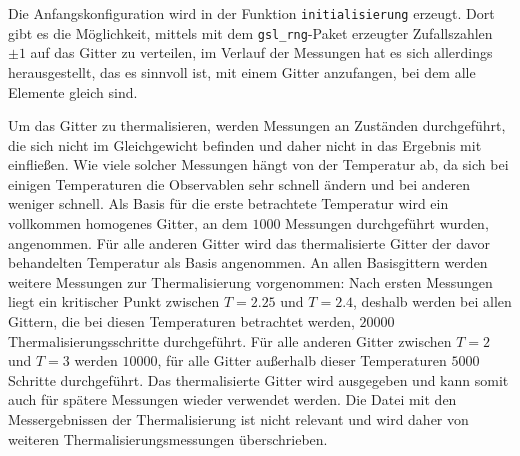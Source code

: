 	
	Die Anfangskonfiguration wird in der Funktion \texttt{initialisierung} erzeugt. Dort gibt es die Möglichkeit, mittels mit dem \texttt{gsl\_rng}-Paket\cite{gsldoc} erzeugter Zufallszahlen $\pm 1$ auf das Gitter zu verteilen, im Verlauf der Messungen hat es sich allerdings herausgestellt, das es sinnvoll ist, mit einem Gitter anzufangen, bei dem alle Elemente gleich sind. 
	
	Um das Gitter zu thermalisieren, werden Messungen an Zuständen durchgeführt, die sich nicht im Gleichgewicht befinden und daher nicht in das Ergebnis mit einfließen. Wie viele solcher Messungen hängt von der Temperatur ab, da sich bei einigen Temperaturen die Observablen sehr schnell ändern und bei anderen weniger schnell. Als Basis für die erste betrachtete Temperatur wird ein vollkommen homogenes Gitter, an dem $\num{1000}$ Messungen durchgeführt wurden, angenommen. Für alle anderen Gitter wird das thermalisierte Gitter der davor behandelten Temperatur als Basis angenommen. An allen Basisgittern werden weitere Messungen zur Thermalisierung vorgenommen: Nach ersten Messungen liegt ein kritischer Punkt zwischen $T=\num{2,25}$ und $T=\num{2,4}$, deshalb werden bei allen Gittern, die bei diesen Temperaturen betrachtet werden, $\num{20000}$ Thermalisierungsschritte durchgeführt. Für alle anderen Gitter zwischen $T=\num{2}$ und $T=\num{3}$ werden $\num{10000}$, für alle Gitter außerhalb dieser Temperaturen $\num{5000}$ Schritte durchgeführt.
	Das thermalisierte Gitter wird ausgegeben und kann somit auch für spätere Messungen wieder verwendet werden. Die Datei mit den Messergebnissen der Thermalisierung ist nicht relevant und wird daher von weiteren Thermalisierungsmessungen überschrieben.
	
